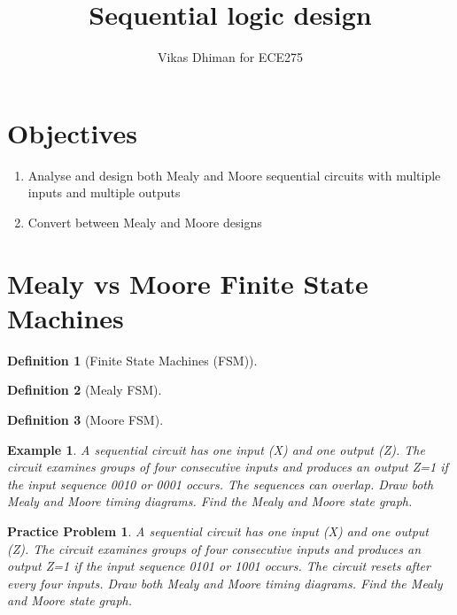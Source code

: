 \documentclass{article}
\author{Vikas Dhiman for ECE275}
\title{Sequential logic design}
\newtheorem{example}{Example}
\newtheorem{prob}{Practice Problem}
\newtheorem{definition}{Definition}
\begin{document}
\maketitle


\section{Objectives}
\begin{enumerate}
  \item Analyse and design both Mealy and Moore sequential circuits with multiple inputs and multiple outputs
  \item Convert between Mealy and Moore designs
\end{enumerate}

\section{Mealy vs Moore Finite State Machines}
\begin{definition}[Finite State Machines (FSM)]~\cite[Sec~3.4]{harris2022digital}
\end{definition}
\vspace{5em}

\begin{definition}[Mealy FSM]~\cite[Sec~3.4.3]{harris2022digital}
\end{definition}
\vspace{5em}

\begin{definition}[Moore FSM]~\cite[Sec~3.4.3]{harris2022digital}
\end{definition}
\vspace{5em}


\begin{example}
  A sequential circuit has one input (X) and one output (Z). The circuit
  examines groups of four consecutive inputs and produces an output Z=1 if the
  input sequence 0010 or 0001 occurs. The sequences can overlap. Draw both Mealy
  and Moore timing diagrams. Find the Mealy and Moore state graph.
\end{example}
\vspace{20em}

\begin{prob}
  A sequential circuit has one input (X) and one output (Z). The circuit
  examines groups of four consecutive inputs and produces an output Z=1 if the
  input sequence 0101 or 1001 occurs. The circuit resets after every four
  inputs. Draw both Mealy and Moore timing diagrams. Find the Mealy and Moore state graph.
\end{prob}
\vspace{20em}



\end{document}

